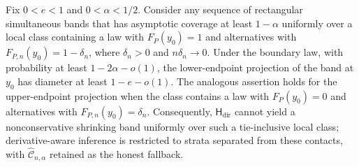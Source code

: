 Fix \(0<e<1\) and \(0<\alpha<1/2\).  Consider any sequence of rectangular simultaneous bands that has asymptotic coverage at least \(1-\alpha\) uniformly over a local class containing a law with \(F_P(y_0)=1\) and alternatives with \(F_{P,n}(y_0)=1-\delta_n\), where \(\delta_n>0\) and \(n\delta_n\to0\).  Under the boundary law, with probability at least \(1-2\alpha-o(1)\), the lower-endpoint projection of the band at \(y_0\) has diameter at least \(1-e-o(1)\).  The analogous assertion holds for the upper-endpoint projection when the class contains a law with \(F_P(y_0)=0\) and alternatives with \(F_{P,n}(y_0)=\delta_n\).  Consequently, \(\mathsf H_{\mathrm{dir}}\) cannot yield a nonconservative shrinking band uniformly over such a tie-inclusive local class; derivative-aware inference is restricted to strata separated from these contacts, with \(\widehat{\mathcal C}_{n,\alpha}\) retained as the honest fallback.